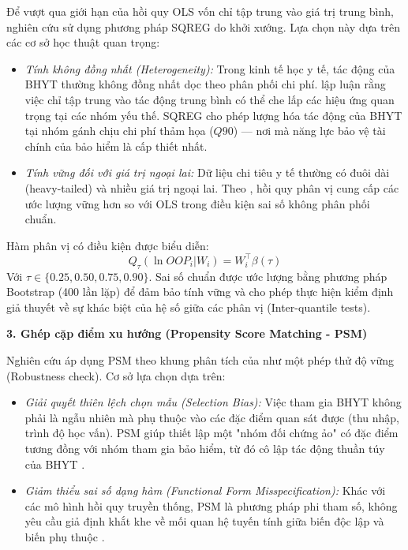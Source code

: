 \documentclass[12pt,a4paper]{article}
\begin{document}
Để vượt qua giới hạn của hồi quy OLS vốn chỉ tập trung vào giá trị trung bình, nghiên cứu sử dụng phương pháp SQREG do \textcite{koenker1978} khởi xướng. Lựa chọn này dựa trên các cơ sở học thuật quan trọng:
\begin{itemize}
	\item \textit{Tính không đồng nhất (Heterogeneity):} Trong kinh tế học y tế, tác động của BHYT thường không đồng nhất dọc theo phân phối chi phí. \textcite{bitler2006} lập luận rằng việc chỉ tập trung vào tác động trung bình có thể che lấp các hiệu ứng quan trọng tại các nhóm yếu thế. SQREG cho phép lượng hóa tác động của BHYT tại nhóm gánh chịu chi phí thảm họa ($Q90$) — nơi mà năng lực bảo vệ tài chính của bảo hiểm là cấp thiết nhất.
	\item \textit{Tính vững đối với giá trị ngoại lai:} Dữ liệu chi tiêu y tế thường có đuôi dài (heavy-tailed) và nhiều giá trị ngoại lai. Theo \textcite{cameron2005}, hồi quy phân vị cung cấp các ước lượng vững hơn so với OLS trong điều kiện sai số không phân phối chuẩn.
\end{itemize}
Hàm phân vị có điều kiện được biểu diễn:
\begin{equation}
	Q_{\tau}(\ln OOP_i | W_i) = W_i^\top \beta(\tau)
\end{equation}
Với $\tau \in \{0.25, 0.50, 0.75, 0.90\}$. Sai số chuẩn được ước lượng bằng phương pháp Bootstrap (400 lần lặp) để đảm bảo tính vững và cho phép thực hiện kiểm định giả thuyết về sự khác biệt của hệ số giữa các phân vị (Inter-quantile tests).

\textbf{3. Ghép cặp điểm xu hướng (Propensity Score Matching - PSM)}

Nghiên cứu áp dụng PSM theo khung phân tích của \textcite{rosenbaum1983} như một phép thử độ vững (Robustness check). Cơ sở lựa chọn dựa trên:
\begin{itemize}
	\item \textit{Giải quyết thiên lệch chọn mẫu (Selection Bias):} Việc tham gia BHYT không phải là ngẫu nhiên mà phụ thuộc vào các đặc điểm quan sát được (thu nhập, trình độ học vấn). PSM giúp thiết lập một "nhóm đối chứng ảo" có đặc điểm tương đồng với nhóm tham gia bảo hiểm, từ đó cô lập tác động thuần túy của BHYT \parencite{dehejia2002}.
	\item \textit{Giảm thiểu sai số dạng hàm (Functional Form Misspecification):} Khác với các mô hình hồi quy truyền thống, PSM là phương pháp phi tham số, không yêu cầu giả định khắt khe về mối quan hệ tuyến tính giữa biến độc lập và biến phụ thuộc \parencite{heckman1998}.
\end{itemize}
\end{document}
